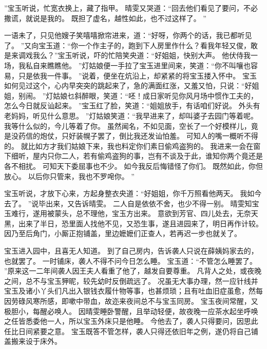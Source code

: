 ”宝玉听说，忙宽衣换上，藏了指甲。
晴雯又哭道：“回去他们看见了要问，不必撒谎，就说是我的。
既担了虚名，越性如此，也不过这样了。
”\par
一语未了，只见他嫂子笑嘻嘻掀帘进来，道：“好呀，你两个的话，我已都听见了。
”又向宝玉道：“你一个作主子的，跑到下人房里作什么？看我年轻又俊，敢是来调戏我么？”宝玉听说，吓的忙陪笑央道：“好姐姐，快别大声。
他伏侍我一场，我私自来瞧瞧他。
”灯姑娘便一手拉了宝玉进里间来，笑道：“你不叫嚷也容易，只是依我一件事。
”说着，便坐在炕沿上，却紧紧的将宝玉搂入怀中。
宝玉如何见过这个，心内早突突的跳起来了，急的满面红涨，又羞又怕，只说：“好姐姐，别闹。
”灯姑娘乜斜醉眼，笑道：“呸！成日家听见你风月场中惯作工夫的，怎么今日就反讪起来。
”宝玉红了脸，笑道：“姐姐放手，有话咱们好说。
外头有老妈妈，听见什么意思。
”灯姑娘笑道：“我早进来了，却叫婆子去园门等着呢。
我等什么似的，今儿等着了你。
虽然闻名，不如见面，空长了一个好模样儿，竟是没药信的炮仗，只好装幌子罢了，倒比我还发讪怕羞。
可知人的嘴一概听不得的。
就比如方才我们姑娘下来，我也料定你们素日偷鸡盗狗的。
我进来一会在窗下细听，屋内只你二人，若有偷鸡盗狗的事，岂有不谈及于此，谁知你两个竟还是各不相扰。
可知天下委屈事也不少。
如今我反后悔错怪了你们。
既然如此，你但放心。
以后你只管来，我也不罗唣你。
”\par
宝玉听说，才放下心来，方起身整衣央道：“好姐姐，你千万照看他两天。
我如今去了。
”说毕出来，又告诉晴雯。
二人自是依依不舍，也少不得一别。
晴雯知宝玉难行，遂用被蒙头，总不理他，宝玉方出来。
意欲到芳官、四儿处去，无奈天黑，出来了半日，恐里面人找他不见，又恐生事，遂且进园来了，明日再作计较。
因乃至后角门，小厮正抱铺盖，里边嬷嬷们正查人，若再迟一步也就关了。
\par
宝玉进入园中，且喜无人知道。
到了自己房内，告诉袭人只说在薛姨妈家去的，也就罢了。
一时铺床，袭人不得不问今日怎么睡。
宝玉道：“不管怎么睡罢了。
”原来这一二年间袭人因王夫人看重了他了，越发自要尊重。
凡背人之处，或夜晚之间，总不与宝玉狎昵，较先幼时反倒疏远了。
况虽无大事办理，然一应针线并宝玉及诸小丫头们凡出入银钱衣履什物等事，也甚烦琐；且有吐血旧症虽愈，然每因劳碌风寒所感，即嗽中带血，故迩来夜间总不与宝玉同房。
宝玉夜间常醒，又极胆小，每醒必唤人。
因晴雯睡卧警醒，且举动轻便，故夜晚一应茶水起坐呼唤之任皆悉委他一人，所以宝玉外床只是他睡。
今他去了，袭人只得要问，因思此任比日间紧要之意。
宝玉既答不管怎样，袭人只得还依旧年之例，遂仍将自己铺盖搬来设于床外。
